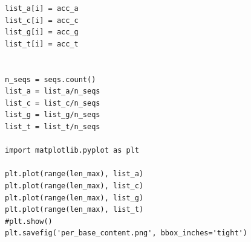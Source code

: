 \begin{lstlisting}
list_a[i] = acc_a
list_c[i] = acc_c
list_g[i] = acc_g
list_t[i] = acc_t


n_seqs = seqs.count()
list_a = list_a/n_seqs
list_c = list_c/n_seqs
list_g = list_g/n_seqs
list_t = list_t/n_seqs

import matplotlib.pyplot as plt

plt.plot(range(len_max), list_a)
plt.plot(range(len_max), list_c)
plt.plot(range(len_max), list_g)
plt.plot(range(len_max), list_t)
#plt.show()
plt.savefig('per_base_content.png', bbox_inches='tight')
\end{lstlisting}


